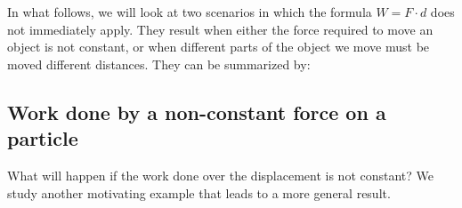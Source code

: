 \documentclass{ximera}
\begin{document}
In what follows, we will look at two scenarios in which the formula $W=F \cdot d$ does not immediately apply.  They result when either the force required to move an object is not constant, or when different parts of the object we move must be moved different distances.  They can be summarized by:


\subsection{Work done by a non-constant force on a particle}

What will happen if the work done over the displacement is not constant?  We study another motivating example that leads to a more general result.
\end{document}
